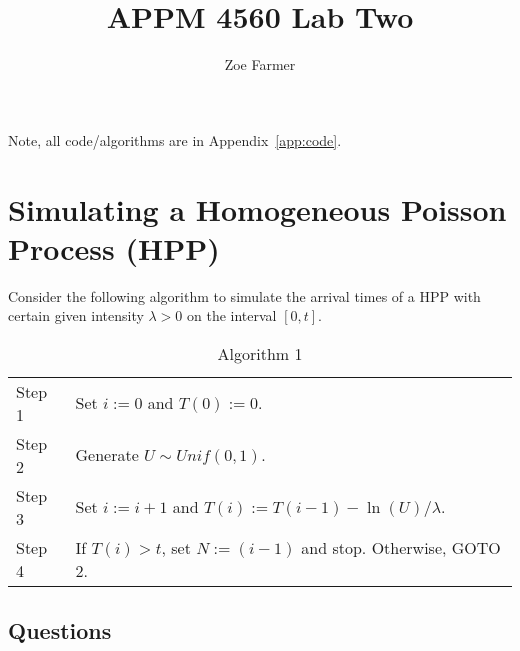 \documentclass[10pt]{article}
\title{APPM 4560 Lab Two}
\author{Zoe Farmer}
\begin{document}
\maketitle

Note, all code/algorithms are in Appendix~\ref{app:code}.

\section{Simulating a Homogeneous Poisson Process (HPP)}

Consider the following algorithm to simulate the arrival times of a HPP with
certain given intensity $\lambda > 0$ on the interval $[0, t]$.

\begin{table}[H]
    \centering
    \begin{tabular}{|l|l|}
        \hline
        Step 1 & Set $i := 0$ and $T(0) := 0$.\\
        Step 2 & Generate $U\sim Unif(0, 1)$.\\
        Step 3 & Set $i := i + 1$ and $T(i) := T(i - 1) - \ln(U) / \lambda$.\\
        Step 4 & If $T(i) > t$, set $N:=(i - 1)$ and stop. Otherwise, GOTO 2.\\
        \hline
    \end{tabular}
    \caption{Algorithm 1}
\end{table}

\subsection{Questions}

\newcommand{\p}{\vspace{0.3cm}}
\newcommand{\image}[1]{\texttt{[image: \#1]}}
\end{document}
